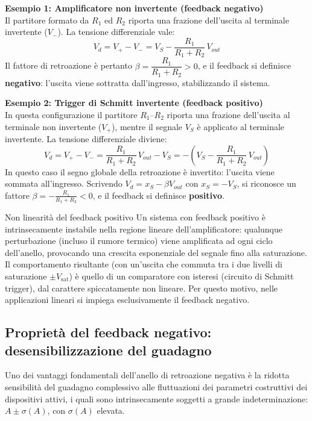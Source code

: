 \noindent
\textbf{Esempio 1: Amplificatore non invertente (feedback negativo)} \\
Il partitore formato da $R_1$ ed $R_2$ riporta una frazione dell'uscita al terminale invertente ($V_-$). La tensione differenziale vale:
\[
    V_d = V_+ - V_- = V_S - \frac{R_1}{R_1 + R_2}\,V_{out}
\]
Il fattore di retroazione è pertanto $\beta = \dfrac{R_1}{R_1 + R_2} > 0$, e il feedback si definisce \textbf{negativo}: l'uscita viene sottratta dall'ingresso, stabilizzando il sistema.

\medskip
\noindent
\textbf{Esempio 2: Trigger di Schmitt invertente (feedback positivo)} \\
In questa configurazione il partitore $R_1$--$R_2$ riporta una frazione dell'uscita al terminale non invertente ($V_+$), mentre il segnale $V_S$ è applicato al terminale invertente. La tensione differenziale diviene:
\[
    V_d = V_+ - V_- = \frac{R_1}{R_1 + R_2}\,V_{out} - V_S
    = -\!\left(V_S - \frac{R_1}{R_1 + R_2}\,V_{out}\right)
\]
In questo caso il segno globale della retroazione è invertito: l'uscita viene sommata all'ingresso. Scrivendo $V_d = x_S - \beta V_{out}$ con $x_S = -V_S$, si riconosce un fattore $\beta = -\frac{R_1}{R_1+R_2} < 0$, e il feedback si definisce \textbf{positivo}.

\begin{osservazione}{Non linearità del feedback positivo}
    Un sistema con feedback positivo è intrinsecamente instabile nella regione lineare dell'amplificatore: qualunque perturbazione (incluso il rumore termico) viene amplificata ad ogni ciclo dell'anello, provocando una crescita esponenziale del segnale fino alla saturazione. Il comportamento risultante (con un'uscita che commuta tra i due livelli di saturazione $\pm V_{\mathrm{sat}}$) è quello di un comparatore con isteresi (circuito di Schmitt trigger), dal carattere spiccatamente non lineare. Per questo motivo, nelle applicazioni lineari si impiega esclusivamente il feedback negativo.
\end{osservazione}

\subsection*{Proprietà del feedback negativo: desensibilizzazione del guadagno}

Uno dei vantaggi fondamentali dell'anello di retroazione negativa è la ridotta sensibilità del guadagno complessivo alle fluttuazioni dei parametri costruttivi dei dispositivi attivi, i quali sono intrinsecamente soggetti a grande indeterminazione: $A \pm \sigma(A)$, con $\sigma(A)$ elevata.

